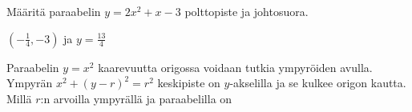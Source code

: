 \begin{tehtavasivu}
\begin{tehtava}
Määritä paraabelin $y = 2x^2+x-3$ polttopiste ja johtosuora.
	\begin{vastaus}
		$(-\frac{1}{4},-3)$ ja $y = \frac{13}{4}$
	\end{vastaus}
\end{tehtava}

\begin{tehtava}
Paraabelin $y = x^2$ kaarevuutta origossa voidaan tutkia ympyröiden avulla. Ympyrän $x^2+(y-r)^2=r^2$ keskipiste on $y$-akselilla ja se kulkee origon kautta. Millä $r$:n arvoilla ympyrällä ja paraabelilla on
\begin{vastaus}
\end{vastaus}
\end{tehtava}

\end{tehtavasivu}

